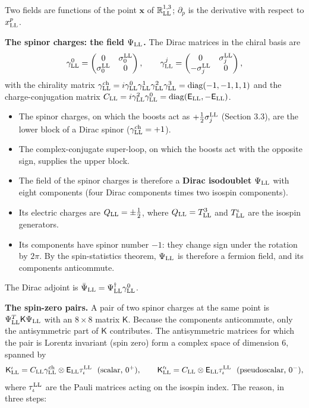 \documentclass[
  10pt,
]{article}
\providecommand{\tightlist}{%
  \setlength{\itemsep}{0pt}\setlength{\parskip}{0pt}}
\begin{document}
Two fields are functions of the point \(\mathbf x\) of
\(\mathbb R^{1,3}_{\rm LL}\); \(\partial_p\) is the derivative with
respect to \(x^p_{\rm LL}\).

\textbf{The spinor charges: the field \(\Psi_{\rm LL}\).} The Dirac
matrices in the chiral basis are
\[\gamma^0_{\rm LL}=\begin{pmatrix}0&\sigma^{\rm LL}_0\\\sigma^{\rm LL}_0&0\end{pmatrix},\qquad\gamma^j_{\rm LL}=\begin{pmatrix}0&\sigma^{\rm LL}_j\\-\sigma^{\rm LL}_j&0\end{pmatrix},\]
with the chirality matrix
\(\gamma^{\rm ch}_{\rm LL}=i\gamma^0_{\rm LL}\gamma^1_{\rm LL}\gamma^2_{\rm LL}\gamma^3_{\rm LL}=\mathrm{diag}(-1,-1,1,1)\)
and the charge-conjugation matrix
\(C_{\rm LL}=i\gamma^2_{\rm LL}\gamma^0_{\rm LL}=\mathrm{diag}(\mathsf E_{\rm LL},-\mathsf E_{\rm LL})\).

\begin{itemize}
\tightlist
\item
  The spinor charges, on which the boosts act as
  \(+\tfrac12\sigma^{\rm LL}_j\) (Section 3.3), are the lower block of a
  Dirac spinor (\(\gamma^{\rm ch}_{\rm LL}=+1\)).
\item
  The complex-conjugate super-loop, on which the boosts act with the
  opposite sign, supplies the upper block.
\item
  The field of the spinor charges is therefore a \textbf{Dirac
  isodoublet} \(\Psi_{\rm LL}\) with eight components (four Dirac
  components times two isospin components).
\item
  Its electric charges are \(Q_{\rm LL}=\pm\tfrac12\), where
  \(Q_{\rm LL}=T^3_{\rm LL}\) and \(T^\iota_{\rm LL}\) are the isospin
  generators.
\item
  Its components have spinor number \(-1\): they change sign under the
  rotation by \(2\pi\). By the spin-statistics theorem,
  \(\Psi_{\rm LL}\) is therefore a fermion field, and its components
  anticommute.
\end{itemize}

The Dirac adjoint is
\(\bar\Psi_{\rm LL}=\Psi^\dagger_{\rm LL}\gamma^0_{\rm LL}\).

\textbf{The spin-zero pairs.} A pair of two spinor charges at the same
point is \(\Psi^T_{\rm LL}\mathsf K\Psi_{\rm LL}\) with an \(8\times8\)
matrix \(\mathsf K\). Because the components anticommute, only the
antisymmetric part of \(\mathsf K\) contributes. The antisymmetric
matrices for which the pair is Lorentz invariant (spin zero) form a
complex space of dimension 6, spanned by
\[\mathsf K^\iota_{\rm LL}=C_{\rm LL}\gamma^{\rm ch}_{\rm LL}\otimes\mathsf E_{\rm LL}\tau^{\rm LL}_\iota\ \ (\text{scalar, }0^+),\qquad\mathsf K'^\iota_{\rm LL}=C_{\rm LL}\otimes\mathsf E_{\rm LL}\tau^{\rm LL}_\iota\ \ (\text{pseudoscalar, }0^-),\]
where \(\tau^{\rm LL}_\iota\) are the Pauli matrices acting on the
isospin index. The reason, in three steps:
\end{document}
